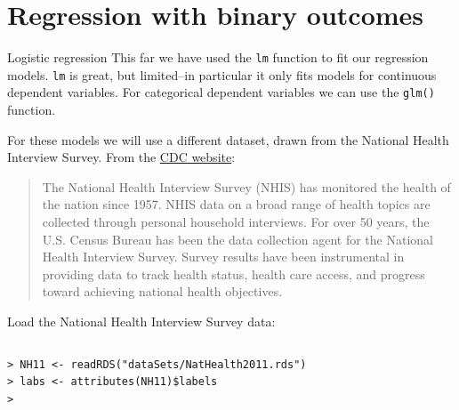 \documentclass[table,smaller]{beamer}
\begin{document}
\section{Regression with binary outcomes}
\label{sec-4}

\begin{frame}[fragile,label=sec-4-1]{Logistic regression}
 This far we have used the \texttt{lm} function to fit our regression models. \texttt{lm} is great, but limited--in particular it only fits models for continuous dependent variables. For categorical dependent variables we can use the \texttt{glm()} function.

For these models we will use a different dataset, drawn from the National Health Interview Survey. From the \href{http://www.cdc.gov/nchs/nhis.htm}{CDC website}:

\begin{quote}
The National Health Interview Survey (NHIS) has monitored the health of the nation since 1957. NHIS data on a broad range of health topics are collected through personal household interviews. For over 50 years, the U.S. Census Bureau has been the data collection agent for the National Health Interview Survey. Survey results have been instrumental in providing data to track health status, health care access, and progress toward achieving national health objectives.
\end{quote}

Load the National Health Interview Survey data:

\vspace{-.5em}
\begin{columns}
\begin{block}{}
\begin{verbatim}
> NH11 <- readRDS("dataSets/NatHealth2011.rds")
> labs <- attributes(NH11)$labels
>
\end{verbatim}
\end{block}
\end{columns}
\vspace{.5em}
\end{frame}
\end{document}
